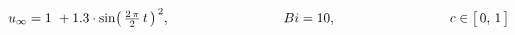 $u _{\infty}  = 1\ + 1.3\cdot\sin\bigl(\,\frac{2\,\pi}{2}\,t\,\bigr)^{\,2}, \hspace{30mm} Bi=10, \hspace{30mm} c \in \big[ \, 0, \, 1 \, \big]$
